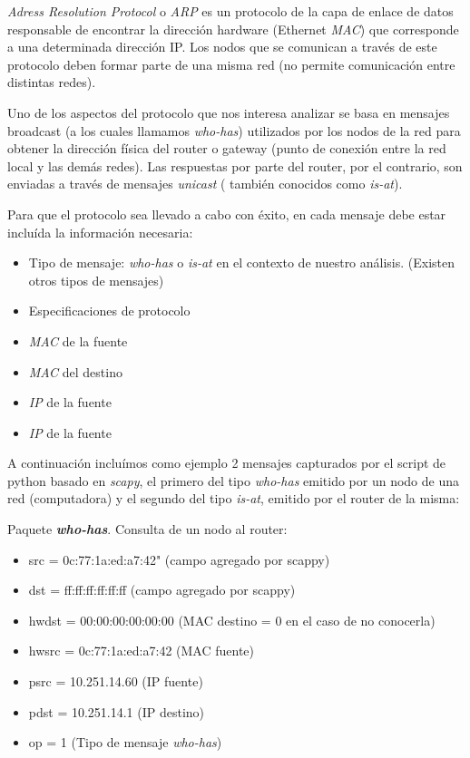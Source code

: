 \emph{Adress Resolution Protocol} o \emph{ARP} es un protocolo de la capa de enlace de datos responsable de encontrar
la dirección hardware (Ethernet \emph{MAC}) que corresponde a una determinada dirección IP. Los nodos que se comunican
a través de este protocolo deben formar parte de una misma red (no permite comunicación entre distintas redes).

Uno de los aspectos del protocolo que nos interesa analizar 
se basa en mensajes broadcast (a los cuales llamamos \emph{who-has}) utilizados por los nodos de la red
para obtener la dirección física del router o gateway (punto de conexión entre la red local y las demás redes).
Las respuestas por parte del router, por el contrario, son enviadas a través de mensajes \emph{unicast} ( 
también conocidos como \emph{is-at}).

Para que el protocolo sea llevado a cabo con éxito, en cada mensaje debe estar incluída la información necesaria:

\begin{itemize}
\item Tipo de mensaje: \emph{who-has} o \emph{is-at} en el contexto de nuestro análisis. (Existen otros tipos de mensajes)
\item Especificaciones de protocolo 
\item \emph{MAC} de la fuente
\item \emph{MAC} del destino 
\item \emph{IP} de la fuente
\item \emph{IP} de la fuente
\end{itemize}

A continuación incluímos como ejemplo 2 mensajes capturados por el script de python basado en \emph{scapy}, el primero del tipo 
\emph{who-has} emitido por un nodo de una red (computadora) y el segundo del tipo \emph{is-at}, emitido por el router
de la misma:

\vspace{1cm}
Paquete \emph{\textbf{who-has}}. Consulta de un nodo al router:

\begin{itemize}
\item src = 0c:77:1a:ed:a7:42" (campo agregado por scappy)
\item dst = ff:ff:ff:ff:ff:ff (campo agregado por scappy)
\item hwdst = 00:00:00:00:00:00 (MAC destino = 0 en el caso de no conocerla)
\item hwsrc = 0c:77:1a:ed:a7:42 (MAC fuente)
\item psrc = 10.251.14.60 (IP fuente)
\item pdst = 10.251.14.1 (IP destino)
\item op = 1 (Tipo de mensaje \emph{who-has})
\end{itemize}


